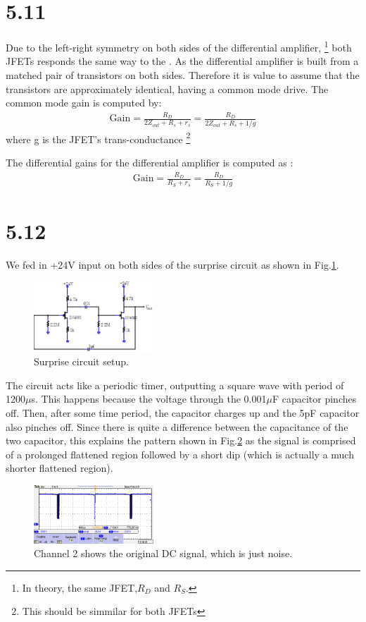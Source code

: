 \documentclass[authoryear, 12pt,5p, times]{elsarticle}
\begin{document}
\section*{5.11}
Due to the left-right symmetry on both sides of the differential amplifier, \footnote{In theory, the same JFET,$R_D$ and $R_S$.} both JFETs responds the same way to the . As the differential amplifier is built from a matched pair of transistors on both sides. Therefore it is value to assume that the transistors are approximately identical, having a common mode drive. The common mode gain is computed by: 
\begin{align*}
\text{Gain}=	\frac{R_D}{2 Z_{out}+R_s+r_s}  = \frac{R_D}{2 Z_{out}+R_s+1/g}
\end{align*}
where g is the JFET's trans-conductance \footnote{ This should be simmilar for both JFETs}
\par The differential gains for the differential amplifier is computed as : 
	\begin{align*}
	\text{Gain}= \frac{R_D}{R_S+r_s} = \frac{R_D}{R_S+1/g}
	\end{align*}
   \section*{5.12}
  We fed in +24V input on both sides of the surprise circuit as shown in Fig.\ref{q12setup}. 
   \begin{figure}[h!]
 \centering
 \includegraphics[width=0.4\textwidth]{figure/q12setup}
\caption{Surprise circuit setup.}
\label{q12setup}
 \end{figure}
  The circuit acts like a periodic timer, outputting a square wave with period of 1200$\mu$s. This happens because the voltage through the 0.001$\mu$F capacitor pinches off. Then, after some time period, the capacitor charges up and the 5pF capacitor also pinches off. Since there is quite a difference between the capacitance of the two capacitor, this explains the pattern shown in Fig.\ref{q12trace} as the signal is comprised of a prolonged flattened region followed by a short dip (which is actually a much shorter flattened region).   %
 \begin{figure}[h!]
 \centering
 \includegraphics[width=0.4\textwidth]{figure/q12trace}
\caption{Channel 2 shows the original DC signal, which is just noise.}
\label{q12trace}
 \end{figure}
\end{document}
